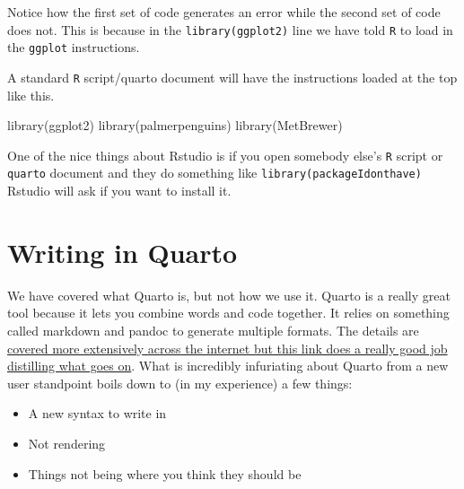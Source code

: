 \documentclass[
  letterpaper,
  DIV=11,
  numbers=noendperiod,
  oneside]{scrreprt}
\newenvironment{Shaded}{\begin{snugshade}}{\end{snugshade}}
\newcommand{\FunctionTok}[1]{\textcolor[rgb]{0.28,0.35,0.67}{#1}}
\newcommand{\NormalTok}[1]{\textcolor[rgb]{0.00,0.23,0.31}{#1}}
\begin{document}
Notice how the first set of code generates an error while the second set
of code does not. This is because in the \texttt{library(ggplot2)} line
we have told \texttt{R} to load in the \texttt{ggplot} instructions.


A standard \texttt{R} script/quarto document will have the instructions
loaded at the top like this.

\begin{Shaded}
\begin{Highlighting}[]
\FunctionTok{library}\NormalTok{(ggplot2)}
\FunctionTok{library}\NormalTok{(palmerpenguins)}
\FunctionTok{library}\NormalTok{(MetBrewer)}
\end{Highlighting}
\end{Shaded}

One of the nice things about Rstudio is if you open somebody else's
\texttt{R} script or \texttt{quarto} document and they do something like
\texttt{library(packageIdonthave)} Rstudio will ask if you want to
install it.


\hypertarget{writing-in-quarto}{%
\chapter{Writing in Quarto}\label{writing-in-quarto}}

We have covered what Quarto is, but not how we use it. Quarto is a
really great tool because it lets you combine words and code together.
It relies on something called markdown and pandoc to generate multiple
formats. The details are
\href{https://quarto.org/docs/faq/rmarkdown.html}{covered more
extensively across the internet but this link does a really good job
distilling what goes on}. What is incredibly infuriating about Quarto
from a new user standpoint boils down to (in my experience) a few
things:

\begin{itemize}
\item
  A new syntax to write in
\item
  Not rendering
\item
  Things not being where you think they should be
\end{itemize}
\end{document}
